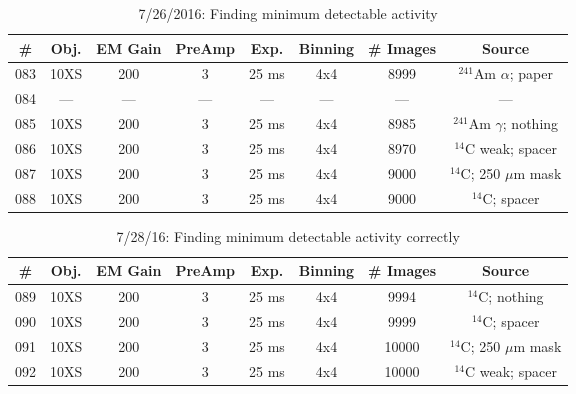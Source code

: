 \documentclass[12pt]{amsart}
\begin{document}
\begin{table}[!htbp]
	\centering
	\caption{7/26/2016: Finding minimum detectable activity}
	\label{tab:table14}
	\hspace*{-1cm}
	\begin{tabular}{cccccccc}
	\toprule
	\# & Obj. & EM Gain & PreAmp & Exp. & Binning & \# Images & Source\\
	\midrule
	083 & 10XS & 200 & 3 & 25 ms & 4x4 & 8999 & $^{241}$Am $\alpha$; paper\\
	084 & --- & --- & --- & --- & --- & --- & ---\\
	085 & 10XS & 200 & 3 & 25 ms & 4x4 & 8985 & $^{241}$Am $\gamma$; nothing\\
	086 & 10XS & 200 & 3 & 25 ms & 4x4 & 8970 & $^{14}$C weak; spacer\\
	087 & 10XS & 200 & 3 & 25 ms & 4x4 & 9000 & $^{14}$C; 250 $\mu$m mask\\
	088 & 10XS & 200 & 3 & 25 ms & 4x4 & 9000 & $^{14}$C; spacer\\
	\bottomrule
	\end{tabular}
	\hspace*{-1cm}
\end{table}

\begin{table}[!htbp]
	\centering
	\caption{7/28/16: Finding minimum detectable activity correctly}
	\label{tab:table15}
	\hspace*{-1cm}
	\begin{tabular}{cccccccc}
	\toprule
	\# & Obj. & EM Gain & PreAmp & Exp. & Binning & \# Images & Source\\
	\midrule
	089 & 10XS & 200 & 3 & 25 ms & 4x4 & 9994 & $^{14}$C; nothing\\
	090 & 10XS & 200 & 3 & 25 ms & 4x4 & 9999 & $^{14}$C; spacer\\
	091 & 10XS & 200 & 3 & 25 ms & 4x4 & 10000 & $^{14}$C; 250 $\mu$m mask\\
	092 & 10XS & 200 & 3 & 25 ms & 4x4 & 10000 & $^{14}$C weak; spacer\\
	\bottomrule
	\end{tabular}
	\hspace*{-1cm}
\end{table}

\clearpage
\end{document}
